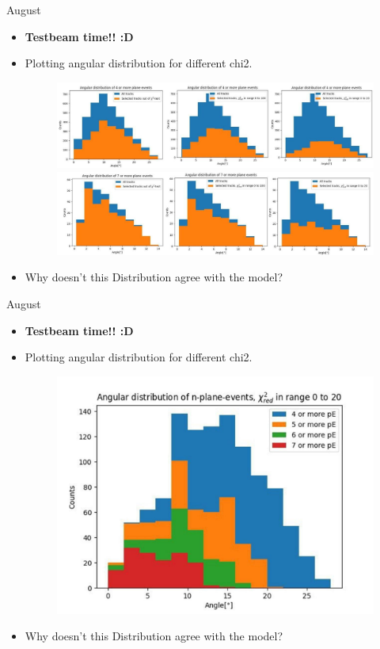 \documentclass{beamer}
\begin{document}
\begin{frame}{August}
    \begin{itemize}
	    \footnotesize
	\item \textbf{Testbeam time!! :D}
	\item Plotting angular distribution for different chi2.
	    \begin{figure}[H]
		\centering
		\includegraphics[width=.9\textwidth]{DavidFinalAngle.jpg} \\
		\includegraphics[width=.9\textwidth]{DavidFinalAngle2.jpg}
	    \end{figure}
	\item Why doesn't this Distribution agree with the model?
    \end{itemize}
\end{frame}

\begin{frame}{August}
    \begin{itemize}
	    \footnotesize
	\item \textbf{Testbeam time!! :D}
	\item Plotting angular distribution for different chi2.
    \begin{figure}[H]
	\centering
	\includegraphics[width=.65\textwidth]{DavidFinalAngle3.jpg}
    \end{figure}
	\item Why doesn't this Distribution agree with the model?
    \end{itemize}
\end{frame}
\end{document}
